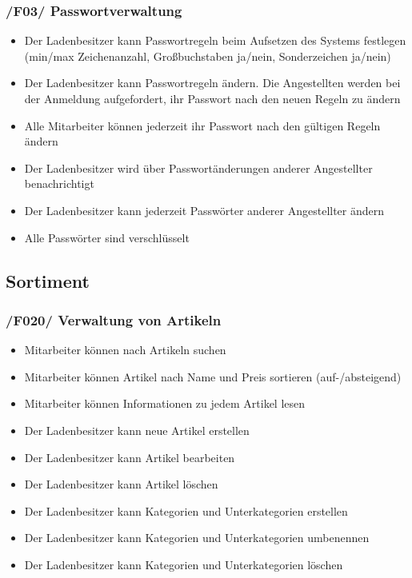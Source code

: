 \documentclass[pdftex,12pt,a4paper]{article}
\begin{document}
\subsubsection*{/F03/ Passwortverwaltung}
\begin{itemize}
\item Der Ladenbesitzer kann Passwortregeln beim Aufsetzen des Systems festlegen (min/max Zeichenanzahl, Gro\ss{}buchstaben ja/nein, Sonderzeichen ja/nein)
\item Der Ladenbesitzer kann Passwortregeln \"andern. Die Angestellten werden bei der Anmeldung aufgefordert, ihr Passwort nach den neuen Regeln zu \"andern
\item Alle Mitarbeiter k\"onnen jederzeit ihr Passwort nach den g\"ultigen Regeln \"andern
\item Der Ladenbesitzer wird \"uber Passwort\"anderungen anderer Angestellter benachrichtigt
\item Der Ladenbesitzer kann jederzeit Passw\"orter anderer Angestellter \"andern
\item Alle Passw\"orter sind verschl\"usselt
\end{itemize}
\subsection*{Sortiment}
\subsubsection*{/F020/ Verwaltung von Artikeln}
\begin{itemize}
\item Mitarbeiter k\"onnen nach Artikeln suchen
\item Mitarbeiter k\"onnen Artikel nach Name und Preis sortieren (auf-/absteigend)
\item Mitarbeiter k\"onnen Informationen zu jedem Artikel lesen
\item Der Ladenbesitzer kann neue Artikel erstellen
\item Der Ladenbesitzer kann Artikel bearbeiten
\item Der Ladenbesitzer kann Artikel l\"oschen
\item Der Ladenbesitzer kann Kategorien und Unterkategorien erstellen
\item Der Ladenbesitzer kann Kategorien und Unterkategorien umbenennen
\item Der Ladenbesitzer kann Kategorien und Unterkategorien l\"oschen
\end{itemize}
\end{document}
